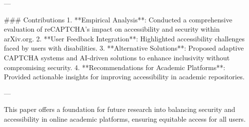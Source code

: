 ---

### Contributions  
1. **Empirical Analysis**: Conducted a comprehensive evaluation of reCAPTCHA's impact on accessibility and security within arXiv.org.  
2. **User Feedback Integration**: Highlighted accessibility challenges faced by users with disabilities.  
3. **Alternative Solutions**: Proposed adaptive CAPTCHA systems and AI-driven solutions to enhance inclusivity without compromising security.  
4. **Recommendations for Academic Platforms**: Provided actionable insights for improving accessibility in academic repositories.

--- 

This paper offers a foundation for future research into balancing security and accessibility in online academic platforms, ensuring equitable access for all users.